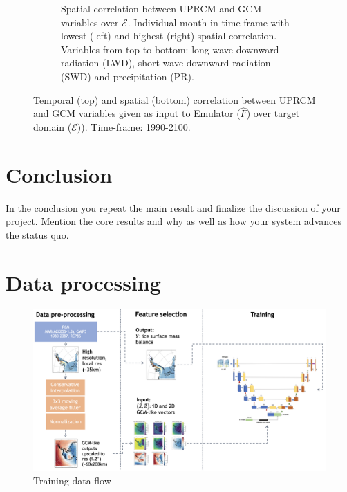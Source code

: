 \documentclass[a4paper,11pt,oneside]{report}
\begin{document}
\begin{figure}[tbp]
\begin{subfigure}[b]{\columnwidth}
            \caption[]%
            {{\small Spatial correlation between UPRCM and GCM variables over $\mathcal{E}$. Individual month in time frame with lowest (left) and highest (right) spatial correlation. Variables from top to bottom: long-wave downward radiation (LWD), short-wave downward radiation (SWD) and precipitation (PR). }}  \label{fig:spatial-corr-GCM-RCM}
        \end{subfigure}
        \hfill
        \caption[]
        {\small Temporal (top) and spatial (bottom) correlation between UPRCM and GCM variables given as input to Emulator ($\hat{F}$) over target domain ($\mathcal{E})$). Time-frame: 1990-2100. } 
        \label{fig:corr-GCM-RCM}
    \end{figure}

\chapter{Conclusion}

In the conclusion you repeat the main result and finalize the discussion of
your project. Mention the core results and why as well as how your system
advances the status quo.

\cleardoublepage
{}
{}
\printbibliography

\appendix
\chapter{Data processing}
\begin{figure}[!t]
  \centering
  \includegraphics[width=\columnwidth]{images/data-flow.png}
  \caption []{\small Training data flow}
  \vspace{-3mm}
  \label{fig:training-data-flow}
\end{figure}
\end{document}

